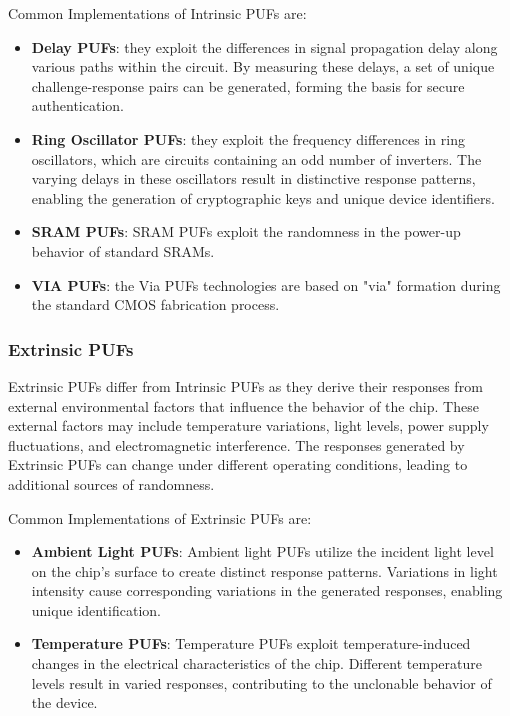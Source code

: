 Common Implementations of Intrinsic PUFs are:
\begin{itemize}
\item \textbf{Delay PUFs}: they exploit the differences in signal propagation delay along various paths within the circuit. By measuring these delays, a set of unique challenge-response pairs can be generated, forming the basis for secure authentication.
\item \textbf{Ring Oscillator PUFs}: they exploit the frequency differences in ring oscillators, which are circuits containing an odd number of inverters. The varying delays in these oscillators result in distinctive response patterns, enabling the generation of cryptographic keys and unique device identifiers.
\item \textbf{SRAM PUFs}: SRAM PUFs exploit the randomness in the power-up behavior of standard SRAMs.
\item \textbf{VIA PUFs}: the Via PUFs technologies are based on "via" formation during the standard CMOS fabrication process. 
\end{itemize}

\subsubsection{Extrinsic PUFs}
Extrinsic PUFs differ from Intrinsic PUFs as they derive their responses from external environmental factors that influence the behavior of the chip. These external factors may include temperature variations, light levels, power supply fluctuations, and electromagnetic interference. The responses generated by Extrinsic PUFs can change under different operating conditions, leading to additional sources of randomness.

Common Implementations of Extrinsic PUFs are:
\begin{itemize}
\item \textbf{Ambient Light PUFs}: Ambient light PUFs utilize the incident light level on the chip's surface to create distinct response patterns. Variations in light intensity cause corresponding variations in the generated responses, enabling unique identification.
\item \textbf{Temperature PUFs}: Temperature PUFs exploit temperature-induced changes in the electrical characteristics of the chip. Different temperature levels result in varied responses, contributing to the unclonable behavior of the device.
\end{itemize}

